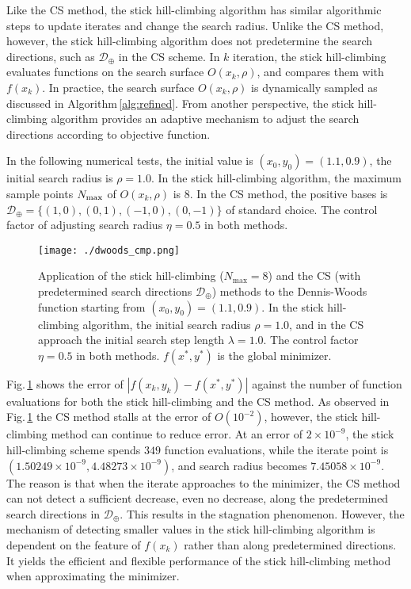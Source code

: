 \documentclass[mathpazo]{aamm}
\newcommand{\bmx}{x}
\begin{document}
Like the CS method, the stick hill-climbing algorithm
has similar algorithmic steps to update iterates and change
the search radius. Unlike the CS method, however, the stick
hill-climbing algorithm does not predetermine the search
directions, such as $\mathcal{D}_{\oplus}$ in the CS scheme. 
In $k$ iteration, the stick hill-climbing evaluates functions on the search
surface $O(\bmx_k, \rho)$, and compares them with $f(\bmx_k)$.
In practice, the search surface $O(\bmx_k, \rho)$ is
dynamically sampled as discussed in Algorithm\,\ref{alg:refined}.
From another perspective, the stick hill-climbing algorithm
provides an adaptive mechanism to adjust the search directions 
according to objective function. 

In the following numerical tests, the initial value is $(x_0, y_0)=(1.1,
0.9)$, the initial search radius is $\rho = 1.0$.
In the stick hill-climbing algorithm, the maximum sample points $N_{\rm{max}}$
of $O(\bmx_k, \rho)$ is $8$. In the CS method, the positive bases is
$\mathcal{D}_{\oplus}=\{(1,0), (0,1), (-1,0), (0,-1)\}$ of standard choice.
The control factor of adjusting search radius $\eta=0.5$ in both methods. 
\begin{figure}[!htbp]
	\centering
	  \texttt{[image: ./dwoods\_cmp.png]}
	  \caption{Application of the stick hill-climbing
	  ($N_{\max}=8$) and the CS (with predetermined search
	  directions $\mathcal{D}_\oplus$) methods to the Dennis-Woods function starting from $(x_0,
	  y_0)=(1.1, 0.9)$. In the stick hill-climbing algorithm, the
	  initial search radius $\rho = 1.0$,
	  and in the CS approach the initial search step length $\lambda=1.0$.
The control factor $\eta=0.5$ in both methods. $f(x^*,y^*)$ is
the global minimizer.}
\label{fig:dwfun:cmp}
\end{figure}

Fig.\,\ref{fig:dwfun:cmp} shows the error of
$|f(x_k,y_k)-f(x^*, y^*)|$ against the number of function
evaluations for both the stick hill-climbing and the CS method. As observed in
Fig.\,\ref{fig:dwfun:cmp} the CS method stalls at the error of 
$O(10^{-2})$, however, the stick hill-climbing method can continue to reduce
error. At an error of $2\times 10^{-9}$, the stick hill-climbing scheme 
spends $349$ function evaluations, while the iterate point is $(1.50249\times
10^{-9}, 4.48273\times 10^{-9})$, and search radius becomes
$7.45058\times 10^{-9}$.
The reason is that when the iterate approaches to the minimizer,
the CS method can not detect a sufficient decrease, even no
decrease, along the predetermined search directions in $\mathcal{D}_{\oplus}$.
This results in the stagnation phenomenon.
However, the mechanism of detecting smaller values in the stick hill-climbing algorithm 
is dependent on the feature of $f(\bmx_k)$ rather
than along predetermined directions. It yields the efficient and
flexible performance of the stick hill-climbing method when
approximating the minimizer.
\end{document}
